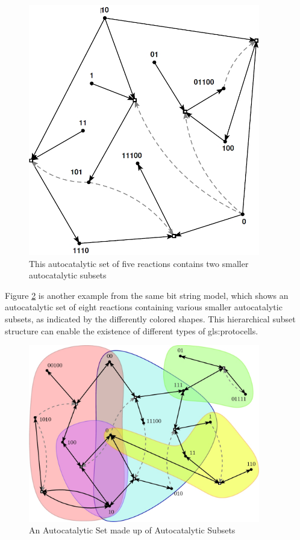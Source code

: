 \documentclass[]{article}
\begin{document}
\begin{figure}[H]
	\caption[Autocatalytic set 	with two smaller autocatalytic subsets]{This autocatalytic set of five reactions
		contains two smaller
		autocatalytic subsets\cite{hordijk2012structure}}\label{fig:AutoCatalytic2}
	\includegraphics[width=0.9\textwidth]{AutoCatalytic2}
\end{figure}

Figure \ref{fig:AutoCatalyticSubsets} is another example from the same bit string model,
which shows an autocatalytic set of eight reactions containing various smaller autocatalytic subsets, as indicated by the differently colored shapes.
This hierarchical subset structure can enable the existence of different types of \glspl{gls:protocell}.

\begin{figure}[H]
	\caption[An Autocatalytic Set made up of Autocatalytic Subsets]{An Autocatalytic Set made up of Autocatalytic Subsets\cite{hordijk2017chasing}}\label{fig:AutoCatalyticSubsets}
	\includegraphics[width=0.9\textwidth]{AutoCatalyticSubsets}
\end{figure}
\end{document}
